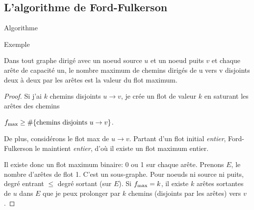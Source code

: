 \subsection{L'algorithme de Ford-Fulkerson}
\begin{myalgo}
  Algorithme \addTODO
\end{myalgo}

\begin{myexem}
  Exemple \addTODO
\end{myexem}

\begin{mylem}
  \label{lem:flot_chemin}
  Dans tout graphe dirigé avec un noeud source $u$ et un noeud puits $v$ et chaque arête de capacité un, le nombre maximum de chemins dirigés de u vers v disjoints deux à deux par les arêtes est la valeur du flot maximum.
  \begin{proof}
    Si j'ai $k$ chemins disjoints $u \to v$,
    je crée un flot de valeur $k$ en saturant les arêtes
    des chemins
    \begin{figure}[h!]
      \centering
    \end{figure}
    $f_\mathrm{max} \geq \#\{\text{chemins disjoints }u \to v\}$.

    De plus, considérons le flot max de $u \to v$.
    Partant d'un flot initial \emph{entier},
    Ford-Fulkerson le maintient \emph{entier},
    d'où il existe un flot maximum entier.

    Il existe donc un flot maximum binaire: 0 ou 1
    sur chaque arête.
    Prenons $E$, le nombre d'arêtes de flot 1.
    C'est un sous-graphe.
    Pour noeuds ni source ni puits,
    degré entrant $\leq$ degré sortant (sur $E$).
    Si $f_\mathrm{max} = k$,
    il existe $k$ arêtes sortantes de $u$ dans $E$ que
    je peux prolonger par $k$ chemins (disjoints par les arêtes)
    vers $v$.


\end{proof}
\end{mylem}
